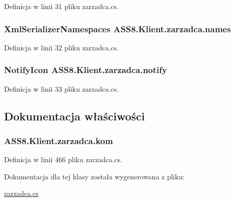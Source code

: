 Definicja w linii 31 pliku zarzadca.cs.\hypertarget{a00037_ade6b1a7122cb3a1f7d719376694dd0e}{
\subsubsection[{names}]{\setlength{\rightskip}{0pt plus 5cm}XmlSerializerNamespaces {\bf ASS8.Klient.zarzadca.names}}}
\label{d1/dc6/a00037_ade6b1a7122cb3a1f7d719376694dd0e}




Definicja w linii 32 pliku zarzadca.cs.\hypertarget{a00037_7c6e834f62b4eb8c8138b736497c9a56}{
\subsubsection[{notify}]{\setlength{\rightskip}{0pt plus 5cm}NotifyIcon {\bf ASS8.Klient.zarzadca.notify}}}
\label{d1/dc6/a00037_7c6e834f62b4eb8c8138b736497c9a56}




Definicja w linii 33 pliku zarzadca.cs.

\subsection{Dokumentacja właściwości}
\hypertarget{a00037_a13c5d1237dd3ac1519ea0225757fce5}{
\subsubsection[{kom}]{ ASS8.Klient.zarzadca.kom}}
\label{d1/dc6/a00037_a13c5d1237dd3ac1519ea0225757fce5}




Definicja w linii 466 pliku zarzadca.cs.

Dokumentacja dla tej klasy została wygenerowana z pliku:\begin{CompactItemize}
\item 
\hyperlink{a00056}{zarzadca.cs}\end{CompactItemize}

